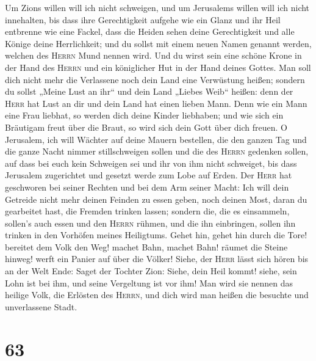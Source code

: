  Um Zions willen will ich nicht schweigen, und um
Jerusalems willen will ich nicht innehalten, bis dass ihre Gerechtigkeit
aufgehe wie ein Glanz und ihr Heil entbrenne wie eine Fackel,
 dass die Heiden sehen deine Gerechtigkeit und alle Könige
deine Herrlichkeit; und du sollst mit einem neuen Namen genannt werden,
welchen des \textsc{Herrn} Mund nennen wird.  Und du wirst
sein eine schöne Krone in der Hand des \textsc{Herrn} und ein
königlicher Hut in der Hand deines Gottes.  Man soll dich
nicht mehr die Verlassene noch dein Land eine Verwüstung heißen; sondern
du sollst „Meine Lust an ihr`` und dein Land „Liebes Weib`` heißen: denn
der \textsc{Herr} hat Lust an dir und dein Land hat einen lieben Mann.
 Denn wie ein Mann eine Frau liebhat, so werden dich deine
Kinder liebhaben; und wie sich ein Bräutigam freut über die Braut, so
wird sich dein Gott über dich freuen.  O Jerusalem, ich
will Wächter auf deine Mauern bestellen, die den ganzen Tag und die
ganze Nacht nimmer stillschweigen sollen und die des \textsc{Herrn}
gedenken sollen, auf dass bei euch kein Schweigen sei  und
ihr von ihm nicht schweiget, bis dass Jerusalem zugerichtet und gesetzt
werde zum Lobe auf Erden.  Der \textsc{Herr} hat
geschworen bei seiner Rechten und bei dem Arm seiner Macht: Ich will
dein Getreide nicht mehr deinen Feinden zu essen geben, noch deinen
Most, daran du gearbeitet hast, die Fremden trinken lassen;
 sondern die, die es einsammeln, sollen's auch essen und
den \textsc{Herrn} rühmen, und die ihn einbringen, sollen ihn trinken in
den Vorhöfen meines Heiligtums.  Gehet hin, gehet hin
durch die Tore! bereitet dem Volk den Weg! machet Bahn, machet Bahn!
räumet die Steine hinweg! werft ein Panier auf über die Völker!
 Siehe, der \textsc{Herr} lässt sich hören bis an der
Welt Ende: Saget der Tochter Zion: Siehe, dein Heil kommt! siehe, sein
Lohn ist bei ihm, und seine Vergeltung ist vor ihm!  Man
wird sie nennen das heilige Volk, die Erlösten des \textsc{Herrn}, und
dich wird man heißen die besuchte und unverlassene Stadt.

\hypertarget{section-62}{%
\section{63}\label{section-62}}

